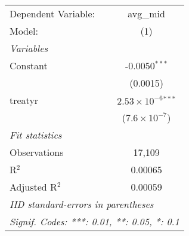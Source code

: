 \begingroup
\centering
\begin{tabular}{lc}
   \tabularnewline \midrule \midrule
   Dependent Variable: & avg\_mid\\   
   Model:              & (1)\\  
   \midrule
   \emph{Variables}\\
   Constant            & -0.0050$^{***}$\\   
                       & (0.0015)\\   
   treatyr             & $2.53\times 10^{-6}$$^{***}$\\    
                       & ($7.6\times 10^{-7}$)\\    
   \midrule
   \emph{Fit statistics}\\
   Observations        & 17,109\\  
   R$^2$               & 0.00065\\  
   Adjusted R$^2$      & 0.00059\\  
   \midrule \midrule
   \multicolumn{2}{l}{\emph{IID standard-errors in parentheses}}\\
   \multicolumn{2}{l}{\emph{Signif. Codes: ***: 0.01, **: 0.05, *: 0.1}}\\
\end{tabular}
\par\endgroup


